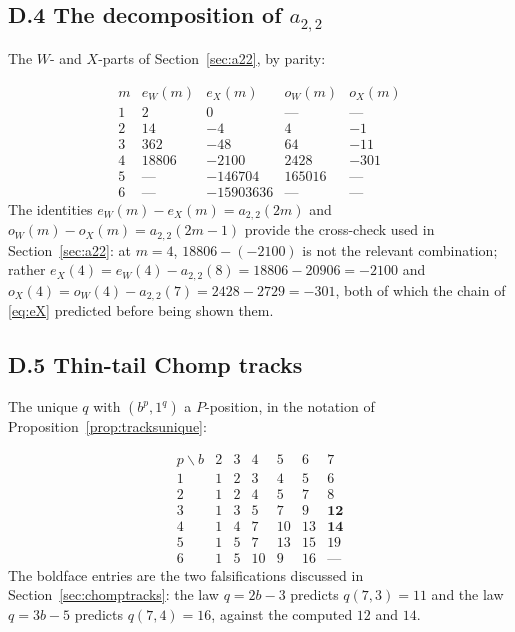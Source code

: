 \documentclass[11pt]{article}
\theoremstyle{definition}
\begin{document}
\subsection*{D.4 The decomposition of $a_{2,2}$}

The $W$- and $X$-parts of Section~\ref{sec:a22}, by parity:

\[
\begin{array}{rrrrr}
m & e_W(m) & e_X(m) & o_W(m) & o_X(m)\\\hline
1 & 2 & 0 & \text{---} & \text{---}\\
2 & 14 & -4 & 4 & -1\\
3 & 362 & -48 & 64 & -11\\
4 & 18806 & -2100 & 2428 & -301\\
5 & \text{---} & -146704 & 165016 & \text{---}\\
6 & \text{---} & -15903636 & \text{---} & \text{---}
\end{array}
\]
The identities $e_W(m)-e_X(m)=a_{2,2}(2m)$ and $o_W(m)-o_X(m)=a_{2,2}(2m-1)$
provide the cross-check used in Section~\ref{sec:a22}: at $m=4$,
$18806-(-2100)$ is not the relevant combination; rather
$e_X(4)=e_W(4)-a_{2,2}(8)=18806-20906=-2100$ and
$o_X(4)=o_W(4)-a_{2,2}(7)=2428-2729=-301$, both of which the chain of
\eqref{eq:eX} predicted before being shown them.

\subsection*{D.5 Thin-tail Chomp tracks}

The unique $q$ with $(b^{p},1^{q})$ a $P$-position, in the notation of
Proposition~\ref{prop:tracksunique}:

\[
\begin{array}{rrrrrrr}
p\backslash b & 2 & 3 & 4 & 5 & 6 & 7\\\hline
1 & 1 & 2 & 3 & 4 & 5 & 6\\
2 & 1 & 2 & 4 & 5 & 7 & 8\\
3 & 1 & 3 & 5 & 7 & 9 & \mathbf{12}\\
4 & 1 & 4 & 7 & 10 & 13 & \mathbf{14}\\
5 & 1 & 5 & 7 & 13 & 15 & 19\\
6 & 1 & 5 & 10 & 9 & 16 & \text{---}
\end{array}
\]
The boldface entries are the two falsifications discussed in
Section~\ref{sec:chomptracks}: the law $q=2b-3$ predicts $q(7,3)=11$ and the
law $q=3b-5$ predicts $q(7,4)=16$, against the computed $12$ and $14$.
\end{document}
